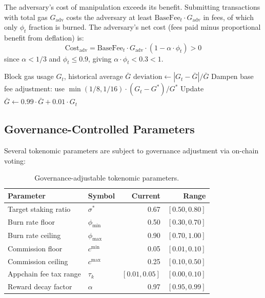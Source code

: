 \begin{proposition}
The adversary's cost of manipulation exceeds its benefit. Submitting transactions with total gas $G_{\text{adv}}$ costs the adversary at least $\text{BaseFee}_t \cdot G_{\text{adv}}$ in fees, of which only $\phi_t$ fraction is burned. The adversary's net cost (fees paid minus proportional benefit from deflation) is:
\begin{equation}
    \text{Cost}_{\text{adv}} = \text{BaseFee}_t \cdot G_{\text{adv}} \cdot (1 - \alpha \cdot \phi_t) > 0
\end{equation}
since $\alpha < 1/3$ and $\phi_t \leq 0.9$, giving $\alpha \cdot \phi_t < 0.3 < 1$.
\end{proposition}

\begin{algorithm}[H]
\caption{Adaptive Base Fee Under Manipulation Detection}
\label{alg:adaptive_base}
\begin{algorithmic}[1]
\Require Block gas usage $G_t$, historical average $\bar{G}$
\State $\text{deviation} \gets |G_t - \bar{G}| / \bar{G}$
 
    \State Dampen base fee adjustment: use $\min(1/8, 1/16) \cdot (G_t - G^*)/G^*$
\EndIf
\State Update $\bar{G} \gets 0.99 \cdot \bar{G} + 0.01 \cdot G_t$ 
\end{algorithmic}
\end{algorithm}

\subsection{Governance-Controlled Parameters}

Several tokenomic parameters are subject to governance adjustment via on-chain voting:

\begin{table}[H]
\centering
\caption{Governance-adjustable tokenomic parameters.}
\label{tab:governance}
\begin{tabular}{llrr}
\toprule
\textbf{Parameter} & \textbf{Symbol} & \textbf{Current} & \textbf{Range} \\
\midrule
Target staking ratio & $\sigma^*$ & 0.67 & $[0.50, 0.80]$ \\
Burn rate floor & $\phi_{\min}$ & 0.50 & $[0.30, 0.70]$ \\
Burn rate ceiling & $\phi_{\max}$ & 0.90 & $[0.70, 1.00]$ \\
Commission floor & $c^{\min}$ & 0.05 & $[0.01, 0.10]$ \\
Commission ceiling & $c^{\max}$ & 0.25 & $[0.10, 0.50]$ \\
Appchain fee tax range & $\tau_k$ & $[0.01, 0.05]$ & $[0.00, 0.10]$ \\
Reward decay factor & $\alpha$ & 0.97 & $[0.95, 0.99]$ \\
\bottomrule
\end{tabular}
\end{table}

